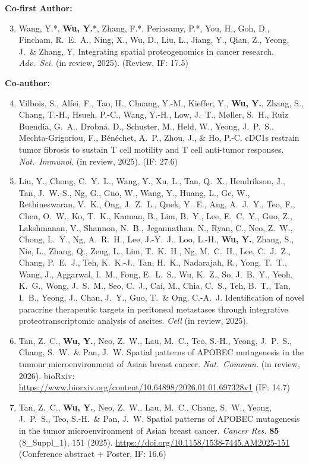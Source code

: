 \documentclass[11pt,a4paper]{article}
\begin{document}
\textbf{Co-first Author:}
\begin{enumerate}\setcounter{enumi}{2}
\item Wang, Y.*, \textbf{Wu, Y.}*, Zhang, F.*, Periasamy, P.*, You, H., Goh, D., Fincham, R.\ E.\ A., Ning, X., Wu, D., Liu, L., Jiang, Y., Qian, Z., Yeong, J.\ \& Zhang, Y. Integrating spatial proteogenomics in cancer research. \textit{Adv.\ Sci.} (in review, 2025). (Review, IF: 17.5)
\end{enumerate}

\textbf{Co-author:}
\begin{enumerate}\setcounter{enumi}{3}
\item Vilbois, S., Alfei, F., Tao, H., Chuang, Y.-M., Kieffer, Y., \textbf{Wu, Y.}, Zhang, S., Chang, T.-H., Hsueh, P.-C., Wang, Y.-H., Low, J.\ T., Møller, S.\ H., Ruiz Buendía, G.\ A., Drobná, D., Schuster, M., Held, W., Yeong, J.\ P.\ S., Mechta-Grigoriou, F., Bénéchet, A.\ P., Zhou, J., \& Ho, P.-C. cDC1s restrain tumor fibrosis to sustain T cell motility and T cell anti-tumor responses. \textit{Nat.\ Immunol.} (in review, 2025). (IF: 27.6)
\item Liu, Y., Chong, C.\ Y.\ L., Wang, Y., Xu, L., Tan, Q.\ X., Hendrikson, J., Tan, J.\ W.-S., Ng, G., Guo, W., Wang, Y., Huang, L., Ge, W., Rethineswaran, V.\ K., Ong, J.\ Z.\ L., Quek, Y.\ E., Ang, A.\ J.\ Y., Teo, F., Chen, O.\ W., Ko, T.\ K., Kannan, B., Lim, B.\ Y., Lee, E.\ C.\ Y., Guo, Z., Lakshmanan, V., Shannon, N.\ B., Jegannathan, N., Ryan, C., Neo, Z.\ W., Chong, L.\ Y., Ng, A.\ R.\ H., Lee, J.-Y.\ J., Loo, L.-H., \textbf{Wu, Y.}, Zhang, S., Nie, L., Zhang, Q., Zeng, L., Lim, T.\ K.\ H., Ng, M.\ C.\ H., Lee, C.\ J.\ Z., Chang, P.\ E.\ J., Teh, K.\ K.-J., Tan, H.\ K., Nadarajah, R., Yong, T.\ T., Wang, J., Aggarwal, I.\ M., Fong, E.\ L.\ S., Wu, K.\ Z., So, J.\ B.\ Y., Yeoh, K.\ G., Wong, J.\ S.\ M., Seo, C.\ J., Cai, M., Chia, C.\ S., Teh, B.\ T., Tan, I.\ B., Yeong, J., Chan, J.\ Y., Guo, T.\ \& Ong, C.-A.\ J. Identification of novel paracrine therapeutic targets in peritoneal metastases through integrative proteotranscriptomic analysis of ascites. \textit{Cell} (in review, 2025).
\item Tan, Z.\ C., \textbf{Wu, Y.}, Neo, Z.\ W., Lau, M.\ C., Teo, S.-H., Yeong, J.\ P.\ S., Chang, S.\ W.\ \& Pan, J.\ W. Spatial patterns of APOBEC mutagenesis in the tumour microenvironment of Asian breast cancer. \textit{Nat.\ Commun.} (in review, 2026). bioRxiv: \url{https://www.biorxiv.org/content/10.64898/2026.01.01.697328v1} (IF: 14.7)
\item Tan, Z.\ C., \textbf{Wu, Y.}, Neo, Z.\ W., Lau, M.\ C., Chang, S.\ W., Yeong, J.\ P.\ S., Teo, S.-H.\ \& Pan, J.\ W. Spatial patterns of APOBEC mutagenesis in the tumor microenvironment of Asian breast cancer. \textit{Cancer Res.} \textbf{85} (8\_Suppl\_1), 151 (2025). \url{https://doi.org/10.1158/1538-7445.AM2025-151} (Conference abstract + Poster, IF: 16.6)

\end{enumerate}
\end{document}
